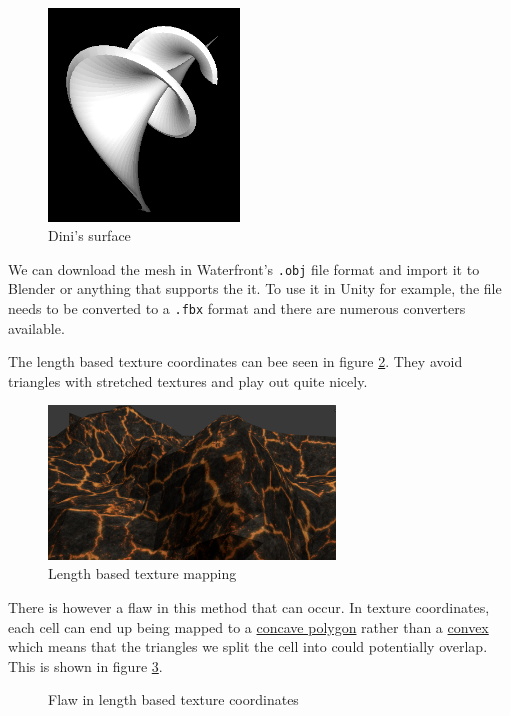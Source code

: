 \documentclass{acmsiggraph}
\begin{document}
\begin{figure}[ht]
  \centering
   \includegraphics[width=2in]{images/dinis.png}
  \caption{Dini's surface}
  \label{fig:dini}
\end{figure}

We can download the mesh in Waterfront's \texttt{.obj} file format and import it to Blender or anything that supports the it. To use it in Unity for example, the file needs to be converted to a \texttt{.fbx} format and there are numerous converters available.

The length based texture coordinates can bee seen in figure \ref{fig:lentex}. They avoid triangles with stretched textures and play out quite nicely.

\begin{figure}[ht]
  \centering
   \includegraphics[width=3in]{images/texture.png}
  \caption{Length based texture mapping}
  \label{fig:lentex}
\end{figure}

There is however a flaw in this method that can occur. In texture coordinates, each cell can end up being mapped to a \href{https://en.wikipedia.org/wiki/Concave_polygon}{concave polygon} rather than a \href{https://en.wikipedia.org/wiki/Convex_polygon}{convex} which means that the triangles we split the cell into could potentially overlap. This is shown in figure \ref{fig:flaw}.

\begin{figure}[ht]
  \centering
  \caption{Flaw in length based texture coordinates}
  \label{fig:flaw}
\end{figure}
\end{document}
